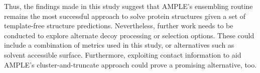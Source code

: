 Thus, the findings made in this study suggest that AMPLE's ensembling routine remains the most successful approach to solve protein structures given a set of template-free structure predictions. Nevertheless, further work needs to be conducted to explore alternate decoy processing or selection options. These could include a combination of metrics used in this study, or alternatives such as solvent accessible surface. Furthermore, exploiting contact information to aid AMPLE's cluster-and-truncate approach could prove a promising alternative, too.
